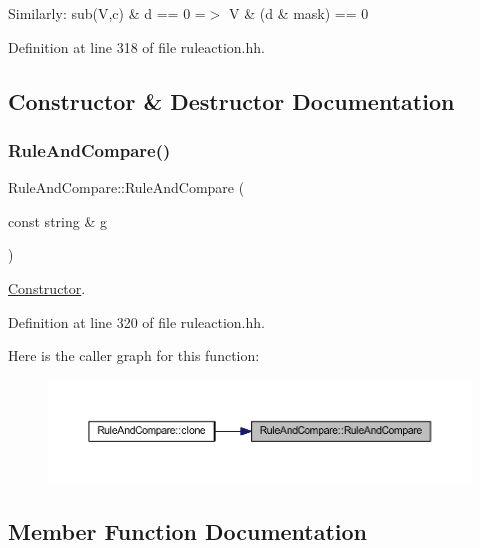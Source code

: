 Similarly\+: {\ttfamily sub(\+V,c) \& d == 0 =$>$ V \& (d \& mask) == 0} 

Definition at line 318 of file ruleaction.\+hh.



\subsection{Constructor \& Destructor Documentation}
\mbox{\label{class_rule_and_compare_a9bd30b1bc948eef91c027250f0bf21d5}} 
\subsubsection{\texorpdfstring{RuleAndCompare()}{RuleAndCompare()}}
{\footnotesize\ttfamily Rule\+And\+Compare\+::\+Rule\+And\+Compare (\begin{DoxyParamCaption}\item[{const string \&}]{g }\end{DoxyParamCaption})\hspace{0.3cm}{\ttfamily [inline]}}



\mbox{\hyperlink{class_constructor}{Constructor}}. 



Definition at line 320 of file ruleaction.\+hh.

Here is the caller graph for this function\+:
\nopagebreak
\begin{figure}[H]
\begin{center}
\leavevmode
\includegraphics[width=350pt]{class_rule_and_compare_a9bd30b1bc948eef91c027250f0bf21d5_icgraph}
\end{center}
\end{figure}


\subsection{Member Function Documentation}
\mbox{\label{class_rule_and_compare_a5bbd46f5a5c6969289ce7084c3bac4f7}} 
